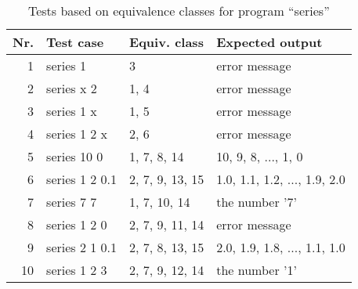 \begin{table}[h]
\begin{center}
\begin{tabular}{|r|l|l|l|}
\hline
Nr. & Test case    & Equiv. class    & Expected output \\
\hline
\hline
1 & series 1       & 3               & error message \\
\hline
2 & series x 2     & 1, 4            & error message  \\
\hline
3 & series 1 x     & 1, 5            & error message  \\
\hline
4 & series 1 2 x   & 2, 6	     & error message  \\
\hline
5 & series 10 0    & 1, 7, 8, 14     & 10, 9, 8, ..., 1, 0\\
\hline
6 & series 1 2 0.1 & 2, 7, 9, 13, 15 & 1.0, 1.1, 1.2, ..., 1.9, 2.0\\
\hline
7 & series 7 7     & 1, 7, 10, 14    & the number '7' \\
\hline
8 & series 1 2 0   & 2, 7, 9, 11, 14 & error message \\
\hline
9 & series 2 1 0.1 & 2, 7, 8, 13, 15 & 2.0, 1.9, 1.8, ..., 1.1, 1.0\\
\hline
10 & series 1 2 3  & 2, 7, 9, 12, 14 & the number '1' \\
\hline
\end{tabular}
\end{center}
\caption{Tests based on equivalence classes for program ``series''}
\label{T:tests-equiv-classes-series}
\end{table}
